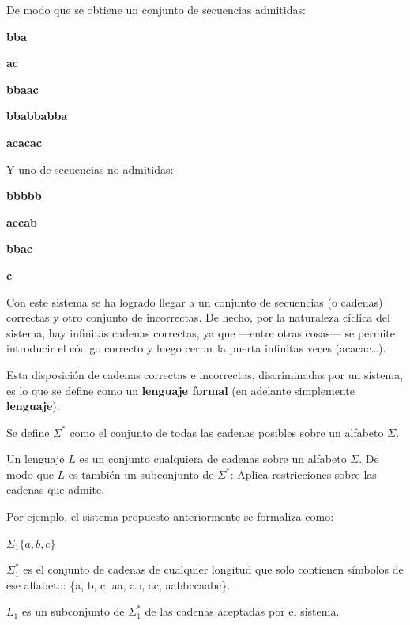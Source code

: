 De modo que se obtiene un conjunto de secuencias admitidas:

\begin{center}

\textbf{bba}
	
\textbf{ac}
	
\textbf{bbaac}
	
\textbf{bbabbabba}
	
\textbf{acacac}

\end{center}

Y uno de secuencias no admitidas:

\begin{center}

\textbf{bbbbb}

\textbf{accab}

\textbf{bbac}

\textbf{c}

\end{center}

Con este sistema se ha logrado llegar a un conjunto de secuencias (o cadenas) correctas y otro conjunto de incorrectas. De hecho, por la naturaleza cíclica del sistema, hay infinitas cadenas correctas, ya que —entre otras cosas— se permite introducir el código correcto y luego cerrar la puerta infinitas veces (acacac\dots). 

Esta disposición de cadenas correctas e incorrectas, discriminadas por un sistema, es lo que se define como un \textbf{lenguaje formal} (en adelante simplemente \textbf{lenguaje}).

\begin{definicion}

Se define $\Sigma^*$ como el conjunto de todas las cadenas posibles sobre un alfabeto $\Sigma$.

Un lenguaje $L$ es un conjunto cualquiera de cadenas sobre un alfabeto $\Sigma$. De modo que $L$ es también un subconjunto de $\Sigma^*$: Aplica restricciones sobre las cadenas que admite.

\end{definicion}

Por ejemplo, el sistema propuesto anteriormente se formaliza como:

\vsp
$\Sigma_1 \{a,b,c\}$

\vsp
$\Sigma_1^*$ es el conjunto de cadenas de cualquier longitud que solo contienen símbolos de ese alfabeto: \{a, b, c, aa, ab, ac, aabbccaabc\}.

\vsp
$L_1$ es un subconjunto de $\Sigma_1^*$ de las cadenas aceptadas por el sistema.

